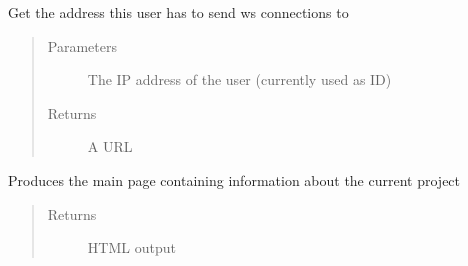 \documentclass[letterpaper,10pt,english]{sphinxmanual}
\begin{document}
\begin{fulllineitems}
\label{\detokenize{funcs:backend.getwsroot}}
Get the address this user has to send ws connections to
\begin{quote}\begin{description}
\item[{Parameters}] \leavevmode
{} \textendash{} The IP address of the user (currently used as ID)

\item[{Returns}] \leavevmode
A URL

\end{description}\end{quote}

\end{fulllineitems}


\begin{fulllineitems}
\label{\detokenize{funcs:backend.projectInfo}}
Produces the main page containing information about the current project
\begin{quote}\begin{description}
\item[{Returns}] \leavevmode
HTML output

\end{description}\end{quote}

\end{fulllineitems}

\end{document}
